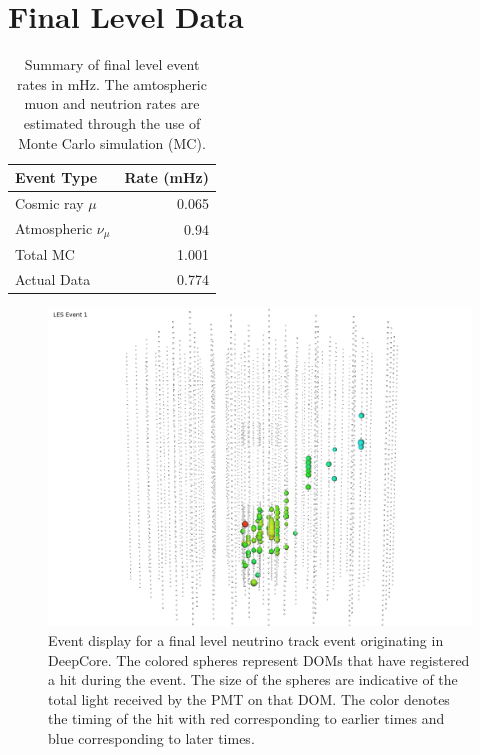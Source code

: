 \documentclass{gatech-thesis}
\begin{document}
\section{Final Level Data}

\begin{table}[h]
\caption[Final level data rate.]{Summary of final level event rates in mHz. The amtospheric muon and neutrion rates are estimated through the use of Monte Carlo simulation (MC).\label{tab:event_rates}}
\begin{center}
\begin{tabular}{|l|r|}
  \hline
 \textbf{Event Type} &\textbf{ Rate (mHz)} \\
\hline
Cosmic ray $\mu$ & 0.065 \\
Atmospheric $\nu_{\mu}$ & 0.94 \\
Total MC & 1.001 \\ \hline
Actual Data     & 0.774 \\ \hline
\end{tabular}
\end{center}
\end{table}


\begin{figure}[ht]
  \begin{center}
    \includegraphics[width=1.0\textwidth,keepaspectratio]{LESEventForThesis.png}
  \end{center}
  \caption{Event display for a final level neutrino track event originating in DeepCore. The colored spheres represent DOMs that have registered a hit during the event. The size of the spheres are indicative of the total light received by the PMT on that DOM. The color denotes the timing of the hit with red corresponding to earlier times and blue corresponding to later times.}
  \label{fig:LESEventFinal}
\end{figure}
\end{document}
